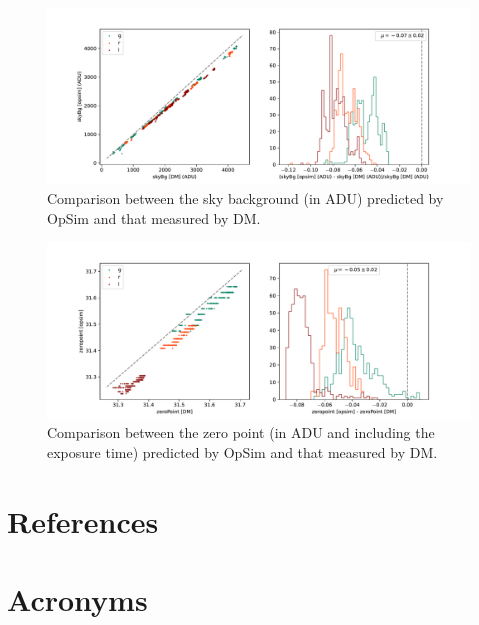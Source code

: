 \documentclass[DM,authoryear,toc]{lsstdoc}
\begin{document}
\begin{figure}
    \includegraphics[width=\textwidth]{figures/or4_opsim_sky.pdf}
    \caption{\label{fig:opsim_sky} Comparison between the sky background (in ADU) predicted by OpSim and that measured by DM.}
\end{figure}

\begin{figure}
    \includegraphics[width=\textwidth]{figures/or4_opsim_zeropoint.pdf}
    \caption{\label{fig:opsim_zp} Comparison between the zero point (in ADU and including the exposure time) predicted by OpSim and that measured by DM.}
\end{figure}

\clearpage

\section{References} \label{sec:bib}
\renewcommand{\refname}{} %


\section{Acronyms} \label{sec:acronyms}

\end{document}
